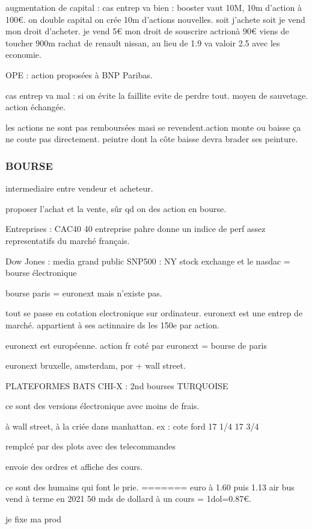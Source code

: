 \documentclass[a4paper,12pt]{article}
\begin{document}
augmentation de capital : cas entrep va bien : booster
vaut 10M, 10m d'action à 100€. on double capital on crée 10m d'actions nouvelles.
soit j'achete soit je vend mon droit d'acheter. je vend 5€ mon droit de souscrire actrionà 90€
viens de toucher 900m rachat de renault nissan, au lieu de 1.9 va valoir 2.5 avec les economie.

OPE : action proposées à BNP Paribas.


cas entrep va mal : si on évite la faillite evite de perdre tout. moyen de sauvetage.
action échangée.


les actions ne sont pas remboursées masi se revendent.action monte ou baisse ça ne coute pas directement.
peintre dont la côte baisse devra brader ses peinture.

\subsubsection{BOURSE}
intermediaire entre vendeur et acheteur.

proposer l'achat et la vente, sûr qd on des action en bourse.

Entreprises : CAC40 40 entreprise pahre  donne un indice de perf assez representatifs du marché français.

Dow Jones : media grand public
SNP500 : 
NY stock exchange et le nasdac = bourse électronique

bourse paris = euronext mais n'existe pas.

tout se passe en cotation electronique sur ordinateur.
euronext est une entrep de marché. appartient à ses actinnaire ds les 150e par action.

euronext est européenne.
action fr coté par euronext = bourse de paris

euronext bruxelle, amsterdam, por + wall street.
 
 
 PLATEFORMES
 BATS
 CHI-X : 2nd bourses 
 TURQUOISE
 
 ce sont des versions électronique avec moins de frais.
 
 à wall street, à la criée dans manhattan.
 ex : cote ford 17 1/4  
 17 3/4
 
 remplcé par des plots avec des telecommandes
 
 envoie des ordres et affiche des cours.
 
 ce sont des humains qui font le prie.
=======
euro à 1.60 puis 1.13 
air bus vend à terme en  2021 50 mds de dollard à un cours = 1dol=0.87€.

je fixe ma prod 
\end{document}
